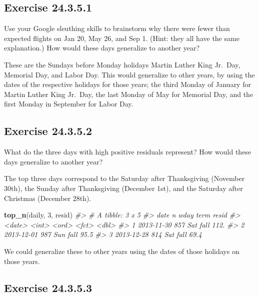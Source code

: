 \documentclass[]{book}
\newenvironment{Shaded}{\begin{snugshade}}{\end{snugshade}}
\newcommand{\CommentTok}[1]{\textcolor[rgb]{0.56,0.35,0.01}{\textit{#1}}}
\newcommand{\DecValTok}[1]{\textcolor[rgb]{0.00,0.00,0.81}{#1}}
\newcommand{\KeywordTok}[1]{\textcolor[rgb]{0.13,0.29,0.53}{\textbf{#1}}}
\newcommand{\NormalTok}[1]{#1}
\theoremstyle{plain}
\theoremstyle{remark}
\begin{document}
\hypertarget{exercise-24.3.5.1}{%
\subsection*{\texorpdfstring{Exercise {24.3.5.1}}{Exercise 24.3.5.1}}\label{exercise-24.3.5.1}}

Use your Google sleuthing skills to brainstorm why there were fewer than expected flights on Jan 20, May 26, and Sep 1. (Hint: they all have the same explanation.) How would these days generalize to another year?

These are the Sundays before Monday holidays Martin Luther King Jr.~Day, Memorial Day, and Labor Day.
This would generalize to other years, by using the dates of the respective
holidays for those years; the third Monday of January for Martin Luther King Jr.~Day,
the last Monday of May for Memorial Day, and the first Monday in September for
Labor Day.

\hypertarget{exercise-24.3.5.2}{%
\subsection*{\texorpdfstring{Exercise {24.3.5.2}}{Exercise 24.3.5.2}}\label{exercise-24.3.5.2}}

What do the three days with high positive residuals represent? How would these days generalize to another year?

The top three days correspond to the Saturday after Thanksgiving (November 30th),
the Sunday after Thanksgiving (December 1st), and the Saturday after Christmas (December 28th).

\begin{Shaded}
\begin{Highlighting}[]
\KeywordTok{top_n}\NormalTok{(daily, }\DecValTok{3}\NormalTok{, resid)}
\CommentTok{#> # A tibble: 3 x 5}
\CommentTok{#>   date           n wday  term  resid}
\CommentTok{#>   <date>     <int> <ord> <fct> <dbl>}
\CommentTok{#> 1 2013-11-30   857 Sat   fall  112. }
\CommentTok{#> 2 2013-12-01   987 Sun   fall   95.5}
\CommentTok{#> 3 2013-12-28   814 Sat   fall   69.4}
\end{Highlighting}
\end{Shaded}

We could generalize these to other years using the dates of those holidays on those
years.

\hypertarget{exercise-24.3.5.3}{%
\subsection*{\texorpdfstring{Exercise {24.3.5.3}}{Exercise 24.3.5.3}}\label{exercise-24.3.5.3}}
\end{document}

